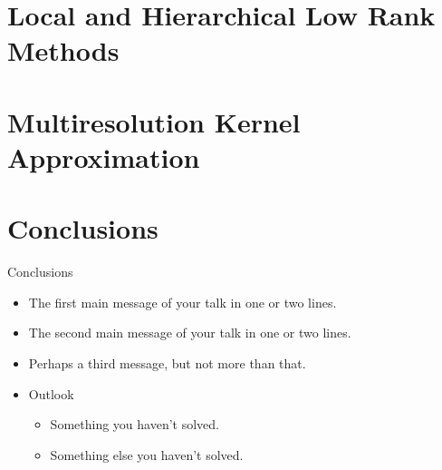 \documentclass{beamer}
\begin{document}
\section{Local and Hierarchical Low Rank Methods}


\section{Multiresolution Kernel Approximation}

\section*{Conclusions}

\begin{frame}{Conclusions}
  \begin{itemize}
  \item
    The \alert{first main message} of your talk in one or two lines.
  \item
    The \alert{second main message} of your talk in one or two lines.
  \item
    Perhaps a \alert{third message}, but not more than that.
  \end{itemize}
  
  \begin{itemize}
  \item
    Outlook
    \begin{itemize}
    \item
      Something you haven't solved.
    \item
      Something else you haven't solved.
    \end{itemize}
  \end{itemize}
\end{frame}
\end{document}
